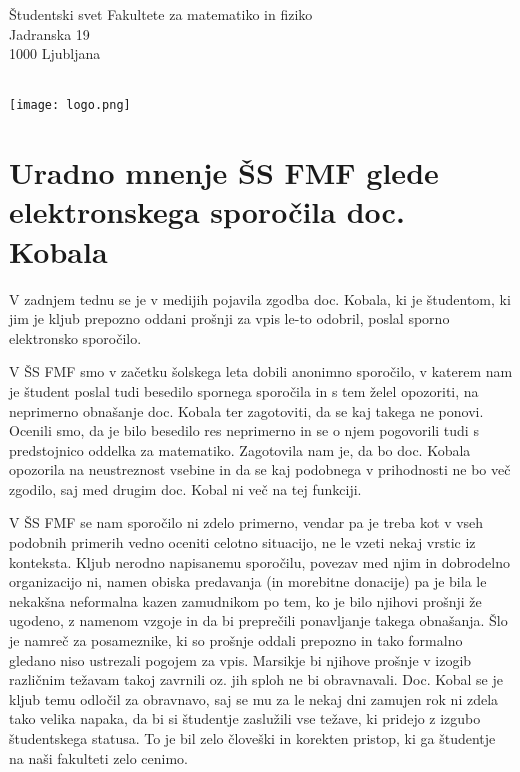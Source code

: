 \documentclass[a4paper,oneside,12pt]{article}
\title{\Title}
\author{\Author}
\date{\today}
\theoremstyle{definition}
\begin{document}
\noindent
\begin{minipage}[t]{0.7\linewidth}
Študentski svet Fakultete za matematiko in fiziko \\
Jadranska 19 \\
1000 Ljubljana \\
\end{minipage}%
\begin{minipage}[t]{0.3\linewidth}
  \mbox{} \\[-15pt]
  \hspace*{\fill} \texttt{[image: logo.png]}
\end{minipage}

\vspace{20pt}

\section*{Uradno mnenje ŠS FMF glede \\ elektronskega sporočila doc. Kobala}

V zadnjem tednu se je v medijih pojavila zgodba doc. Kobala, ki je študentom, ki jim je kljub prepozno oddani prošnji za vpis le-to odobril, poslal sporno elektronsko sporočilo.

V ŠS FMF smo v začetku šolskega leta dobili anonimno sporočilo, v katerem nam je študent poslal tudi besedilo spornega sporočila in s tem želel opozoriti, na neprimerno obnašanje doc. Kobala ter zagotoviti, da se kaj takega ne ponovi. Ocenili smo, da je bilo besedilo res neprimerno in se o njem pogovorili tudi s predstojnico oddelka za matematiko. Zagotovila nam je, da bo doc. Kobala opozorila na neustreznost vsebine in da se kaj podobnega v prihodnosti ne bo več zgodilo, saj med drugim doc. Kobal ni več na tej funkciji.

V ŠS FMF se nam sporočilo ni zdelo primerno, vendar pa je treba kot v vseh podobnih primerih vedno oceniti celotno situacijo, ne le vzeti nekaj vrstic iz konteksta. Kljub nerodno napisanemu sporočilu, povezav med njim in dobrodelno organizacijo ni, namen obiska predavanja (in morebitne donacije) pa je bila le nekakšna neformalna kazen zamudnikom po tem, ko je bilo njihovi prošnji že ugodeno, z namenom vzgoje in da bi preprečili ponavljanje takega obnašanja. Šlo je namreč za posameznike, ki so prošnje oddali prepozno in tako formalno gledano niso ustrezali pogojem za vpis. Marsikje bi njihove prošnje v izogib različnim težavam takoj zavrnili oz. jih sploh ne bi obravnavali. Doc. Kobal se je kljub temu odločil za obravnavo, saj se mu za le nekaj dni zamujen rok ni zdela tako velika napaka, da bi si študentje zaslužili vse težave, ki pridejo z izgubo študentskega statusa. To je bil zelo človeški in korekten pristop, ki ga študentje na naši fakulteti zelo cenimo.
\end{document}
